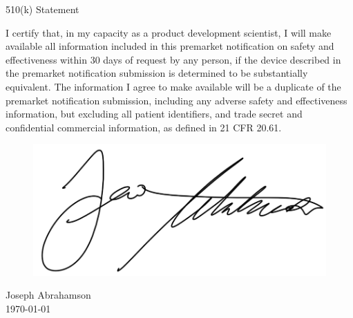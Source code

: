 \newpage
{}
\singlespacing
\begin{center}
  \large{510(k) Statement}
\end{center}

\onehalfspacing


I certify that, in my capacity as a product development scientist, I
will make available all information included in this premarket
notification on safety and effectiveness within 30 days of request by
any person, if the device described in the premarket notification
submission is determined to be substantially equivalent. The
information I agree to make available will be a duplicate of the
premarket notification submission, including any adverse safety and
effectiveness information, but excluding all patient identifiers, and
trade secret and confidential commercial information, as defined in 21
CFR 20.61.

\begin{figure}[H]
  \includegraphics[width=0.35\linewidth]{imgs/ja-sig}
\end{figure}

\noindent Joseph Abrahamson \\
\today



